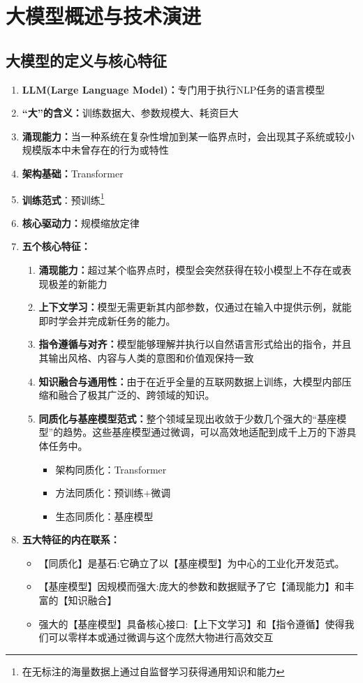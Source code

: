 \documentclass[../main.tex]{subfiles}
\begin{document}
\section{大模型概述与技术演进}\label{sec:llm-overview}
\subsection{大模型的定义与核心特征}\label{sec:llm-core-features}
\begin{enumerate}
    \item \textbf{LLM(Large Language Model)：}专门用于执行NLP任务的语言模型
    \item \textbf{“大”的含义：}训练数据大、参数规模大、耗资巨大
    \item \textbf{涌现能力：}当一种系统在复杂性增加到某一临界点时，会出现其子系统或较小规模版本中未曾存在的行为或特性
    \item \textbf{架构基础：}Transformer
    \item \textbf{训练范式}：预训练\footnote{在无标注的海量数据上通过自监督学习获得通用知识和能力}
    \item \textbf{核心驱动力：}规模缩放定律
    \item \textbf{五个核心特征：}
    \begin{enumerate}
        \item \textbf{涌现能力：}超过某个临界点时，模型会突然获得在较小模型上不存在或表现极差的新能力
        \item \textbf{上下文学习：}模型无需更新其内部参数，仅通过在输入中提供示例，就能即时学会并完成新任务的能力。
        \item \textbf{指令遵循与对齐：}模型能够理解并执行以自然语言形式给出的指令，并且其输出风格、内容与人类的意图和价值观保持一致
        \item \textbf{知识融合与通用性：}由于在近乎全量的互联网数据上训练，大模型内部压缩和融合了极其广泛的、跨领域的知识。
        \item \textbf{同质化与基座模型范式：}整个领域呈现出收敛于少数几个强大的“基座模型”的趋势。这些基座模型通过微调，可以高效地适配到成千上万的下游具体任务中。
        \begin{itemize}
            \item 架构同质化：Transformer
            \item 方法同质化：预训练+微调
            \item 生态同质化：基座模型
        \end{itemize}
    \end{enumerate}
    \item \textbf{五大特征的内在联系：}
    \begin{itemize}
        \item 【同质化】是基石:它确立了以【基座模型】为中心的工业化开发范式。
        \item 【基座模型】因规模而强大:庞大的参数和数据赋予了它【涌现能力】和丰富的【知识融合】
        \item 强大的【基座模型】具备核心接口:【上下文学习】和【指令遵循】使得我们可以零样本或通过微调与这个庞然大物进行高效交互
    \end{itemize}
\end{enumerate}
\end{document}
